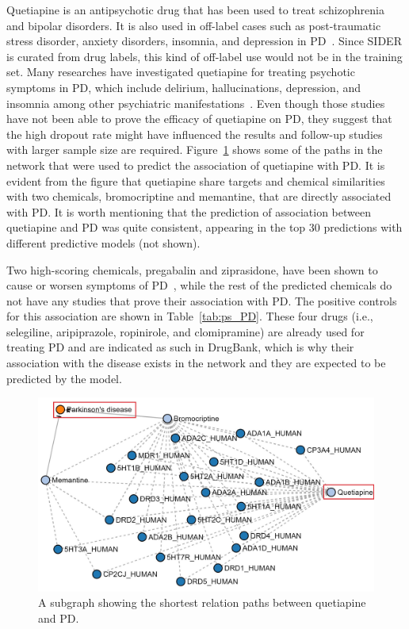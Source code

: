 Quetiapine is an antipsychotic drug that has been used to treat schizophrenia and bipolar disorders.
It is also used in off-label cases such as post-traumatic stress disorder, anxiety disorders, insomnia, and depression in \ac{PD}~\cite{el-saifi_quetiapine_2016}.
Since SIDER is curated from drug labels, this kind of off-label use would not be in the training set.
Many researches have investigated quetiapine for treating psychotic symptoms in \ac{PD}, which include delirium, hallucinations, depression, and insomnia among other psychiatric manifestations~\cite{desmarais_quetiapine_2016}.
Even though those studies have not been able to prove the efficacy of quetiapine on \ac{PD}, they suggest that the high dropout rate might have influenced the results and follow-up studies with larger sample size are required.
Figure~\ref{fig:parkinson_quetiapine} shows some of the paths in the network that were used to predict the association of quetiapine with \ac{PD}.
It is evident from the figure that quetiapine share targets and chemical similarities with two chemicals, bromocriptine and memantine, that are directly associated with \ac{PD}.
It is worth mentioning that the prediction of association between quetiapine and \ac{PD} was quite consistent, appearing in the top 30 predictions with different predictive models (not shown).

Two high-scoring chemicals, pregabalin and ziprasidone, have been shown to cause or worsen symptoms of \ac{PD}~\cite{perez_lloret_pregabalin-induced_2009, younce_systematic_2019}, while the rest of the predicted chemicals do not have any studies that prove their association with \ac{PD}.
The positive controls for this association are shown in Table~\ref{tab:ps_PD}.
These four drugs (i.e., selegiline, aripiprazole, ropinirole, and clomipramine) are already used for treating \ac{PD} and are indicated as such in DrugBank, which is why their association with the disease exists in the network and they are expected to be predicted by the model.

\begin{figure}[!ht]
    \centering
    \includegraphics[scale=0.6]
    {figures/parkinson_quetiapine.jpg}
    \captionsetup{justification=centering}
    \caption[Quetiapine's path subgraph in Parkinson's disease]{\label{fig:parkinson_quetiapine} A subgraph showing the shortest relation paths between quetiapine and \ac{PD}.}
\end{figure}

